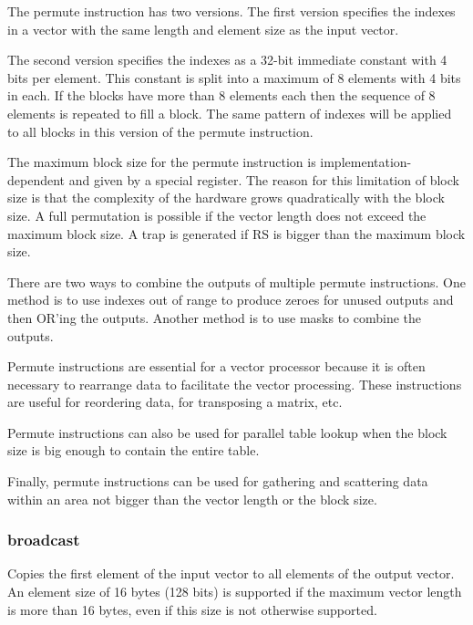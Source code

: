 \documentclass[forwardcom.tex]{subfiles}
\begin{document}
The permute instruction has two versions. The first version specifies the indexes in a vector with the same length and element size as the input vector.
\vspace{2mm}

The second version specifies the indexes as a 32-bit immediate constant with 4 bits per element. This constant is split into a maximum of 8 elements with 4 bits in each. If the blocks have more than 8 elements each then the sequence of 8 elements is repeated to fill a block. The same pattern of indexes will be applied to all blocks in this version of the permute instruction.
\vspace{2mm}

The maximum block size for the permute instruction is implementation-dependent and given by a special register. The reason for this limitation of block size is that the complexity of the hardware grows quadratically with the block size. A full permutation is possible if the vector length does not exceed the maximum block size. A trap is generated if RS is bigger than the maximum block size.
\vspace{2mm}

There are two ways to combine the outputs of multiple permute instructions. One method is to use indexes out of range to produce zeroes for unused outputs and then OR'ing the outputs. Another method is to use masks to combine the outputs.
\vspace{2mm}

Permute instructions are essential for a vector processor because it is often necessary to rearrange data to facilitate the vector processing. These instructions are useful for reordering data, for transposing a matrix, etc. 
\vspace{2mm}

Permute instructions can also be used for parallel table lookup when the block size is big enough to contain the entire table.
\vspace{2mm}

Finally, permute instructions can be used for gathering and scattering data within an area not bigger than the vector length or the block size.

\subsubsection{broadcast}
Copies the first element of the input vector to all elements of the output vector. An element size of 16 bytes (128 bits) is supported if the maximum vector length is more than 16 bytes, even if this size is not otherwise supported.
\end{document}
